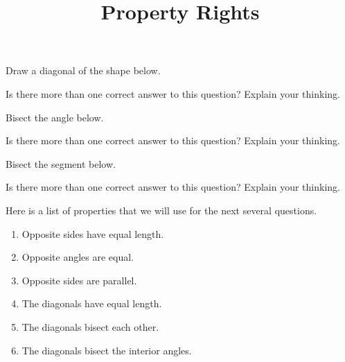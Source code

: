 \documentclass[noauthor, nooutcomes]{ximera}
\title{Property Rights}
\begin{document}
\begin{abstract}\end{abstract}
\maketitle



\begin{problem}
Draw a diagonal of the shape below. 
\begin{image}
\end{image}
Is there more than one correct answer to this question? Explain your thinking.
\end{problem}


\begin{problem}
Bisect the angle below. 
\begin{image}  \end{image}
Is there more than one correct answer to this question? Explain your thinking.
\end{problem}

\newpage
\begin{problem}
Bisect the segment below. 
\begin{center}  \end{center}
Is there more than one correct answer to this question? Explain your thinking.
\end{problem}

Here is a list of properties that we will use for the next several questions.
\begin{enumerate}[label=P{\arabic*}.]
    \item Opposite sides have equal length.
    \item Opposite angles are equal.
    \item Opposite sides are parallel. %
    \item The diagonals have equal length.
    \item The diagonals bisect each other.
    \item The diagonals bisect the interior angles.
\end{enumerate} 
\end{document}
